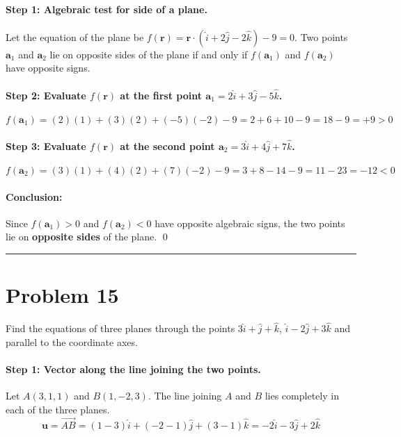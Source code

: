 \documentclass[11pt,a4paper]{article}
\begin{document}
\paragraph{Step 1: Algebraic test for side of a plane.}
Let the equation of the plane be $f(\mathbf{r}) = \mathbf{r}\cdot(\hat{i} + 2\hat{j} - 2\hat{k}) - 9 = 0$. Two points $\mathbf{a}_1$ and $\mathbf{a}_2$ lie on opposite sides of the plane if and only if $f(\mathbf{a}_1)$ and $f(\mathbf{a}_2)$ have opposite signs.

\paragraph{Step 2: Evaluate $f(\mathbf{r})$ at the first point $\mathbf{a}_1 = 2\hat{i} + 3\hat{j} - 5\hat{k}$.}
$$f(\mathbf{a}_1) = (2)(1) + (3)(2) + (-5)(-2) - 9 = 2 + 6 + 10 - 9 = 18 - 9 = +9 > 0$$

\paragraph{Step 3: Evaluate $f(\mathbf{r})$ at the second point $\mathbf{a}_2 = 3\hat{i} + 4\hat{j} + 7\hat{k}$.}
$$f(\mathbf{a}_2) = (3)(1) + (4)(2) + (7)(-2) - 9 = 3 + 8 - 14 - 9 = 11 - 23 = -12 < 0$$

\paragraph{Conclusion:}
Since $f(\mathbf{a}_1) > 0$ and $f(\mathbf{a}_2) < 0$ have opposite algebraic signs, the two points lie on \textbf{opposite sides} of the plane. \qed

\vspace{0.4cm}
\hrule
\vspace{0.4cm}

\section{Problem 15}
\begin{problembox}[Problem 15]
Find the equations of three planes through the points $3\hat{i} + \hat{j} + \hat{k}$, $\hat{i} - 2\hat{j} + 3\hat{k}$ and parallel to the coordinate axes.
\end{problembox}

\paragraph{Step 1: Vector along the line joining the two points.}
Let $A(3, 1, 1)$ and $B(1, -2, 3)$. The line joining $A$ and $B$ lies completely in each of the three planes.
$$\mathbf{u} = \vec{AB} = (1 - 3)\hat{i} + (-2 - 1)\hat{j} + (3 - 1)\hat{k} = -2\hat{i} - 3\hat{j} + 2\hat{k}$$
\end{document}
